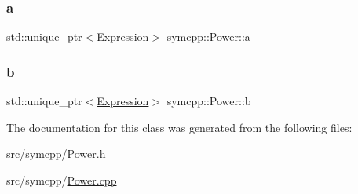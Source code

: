 \subsubsection{\texorpdfstring{a}{a}}
{\footnotesize\ttfamily std\+::unique\+\_\+ptr$<$\mbox{\hyperlink{classsymcpp_1_1Expression}{Expression}}$>$ symcpp\+::\+Power\+::a\hspace{0.3cm}{\ttfamily [private]}}

\mbox{\label{classsymcpp_1_1Power_add4b954bcfa942f2d14ed40713d92ad8}} 
\subsubsection{\texorpdfstring{b}{b}}
{\footnotesize\ttfamily std\+::unique\+\_\+ptr$<$\mbox{\hyperlink{classsymcpp_1_1Expression}{Expression}}$>$ symcpp\+::\+Power\+::b\hspace{0.3cm}{\ttfamily [private]}}



The documentation for this class was generated from the following files\+:\begin{DoxyCompactItemize}
\item 
src/symcpp/\mbox{\hyperlink{Power_8h}{Power.\+h}}\item 
src/symcpp/\mbox{\hyperlink{Power_8cpp}{Power.\+cpp}}\end{DoxyCompactItemize}
